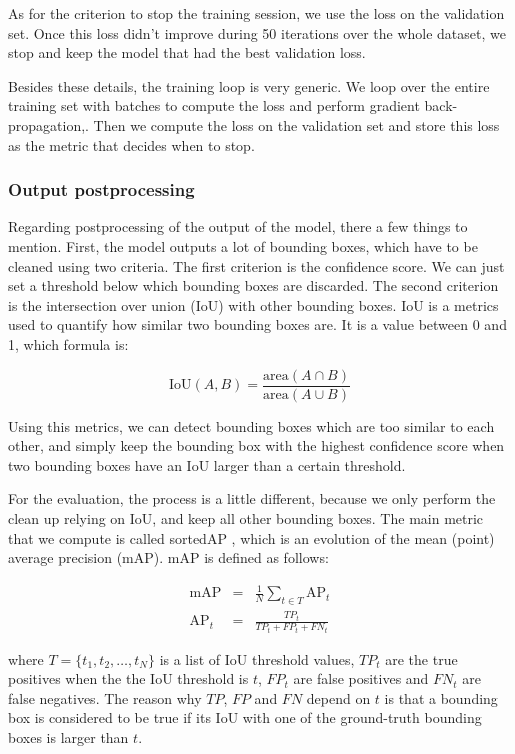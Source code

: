 \documentclass[
  letterpaper,
  DIV=11,
  numbers=noendperiod]{scrartcl}
\begin{document}
As for the criterion to stop the training session, we use the loss on
the validation set. Once this loss didn't improve during 50 iterations
over the whole dataset, we stop and keep the model that had the best
validation loss.

Besides these details, the training loop is very generic. We loop over
the entire training set with batches to compute the loss and perform
gradient back-propagation,. Then we compute the loss on the validation
set and store this loss as the metric that decides when to stop.

\subsubsection{Output postprocessing}\label{output-postprocessing}

Regarding postprocessing of the output of the model, there a few things
to mention. First, the model outputs a lot of bounding boxes, which have
to be cleaned using two criteria. The first criterion is the confidence
score. We can just set a threshold below which bounding boxes are
discarded. The second criterion is the intersection over union (IoU)
with other bounding boxes. IoU is a metrics used to quantify how similar
two bounding boxes are. It is a value between 0 and 1, which formula is:

\[
\text{IoU}(A, B) = \frac{\text{area}(A \cap B)}{\text{area}(A \cup B)}
\]

Using this metrics, we can detect bounding boxes which are too similar
to each other, and simply keep the bounding box with the highest
confidence score when two bounding boxes have an IoU larger than a
certain threshold.

For the evaluation, the process is a little different, because we only
perform the clean up relying on IoU, and keep all other bounding boxes.
The main metric that we compute is called sortedAP \autocite{sortedAP},
which is an evolution of the mean (point) average precision (mAP). mAP
is defined as follows:

\[
\begin{array}{rcl}
\text{mAP} & = & \frac{1}{N} \sum\limits_{t\in T} \text{AP}_t \\
\text{AP}_t & = & \frac{{TP}_t}{{TP}_t + {FP}_t + {FN}_t}
\end{array}
\]

where \(T=\{t_1, t_2, \dots, t_N\}\) is a list of IoU threshold values,
\({TP}_t\) are the true positives when the the IoU threshold is \(t\),
\({FP}_t\) are false positives and \({FN}_t\) are false negatives. The
reason why \(TP\), \(FP\) and \(FN\) depend on \(t\) is that a bounding
box is considered to be true if its IoU with one of the ground-truth
bounding boxes is larger than \(t\).
\end{document}
